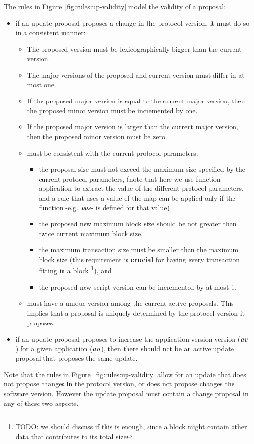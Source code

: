 The rules in Figure~\ref{fig:rules:up-validity} model the validity of a proposal:
\begin{itemize}
\item if an update proposal proposes a change in the protocol version, it must
  do so in a consistent manner:
  \begin{itemize}
  \item The proposed version must be lexicographically bigger than the
    current version.
  \item The major versions of the proposed and current version must differ in
    at most one.
  \item If the proposed major version is equal to the current major
    version, then the proposed minor version must be incremented by one.
  \item If the proposed major version is larger than the current major version,
    then the proposed minor version must be zero.
  \item must be consistent with the current protocol parameters:
    \begin{itemize}
    \item the proposal size must not exceed the maximum size specified by the
      current protocol parameters, (note that here we use function application
      to extract the value of the different protocol parameters, and a rule
      that uses a value of the map can be applied only if the function -e.g.
      $\mathit{pps}$- is defined for that value)
    \item the proposed new maximum block size should be not greater than twice
      current maximum block size,
    \item the maximum transaction size must be smaller than the maximum block
      size (this requirement is \textbf{crucial} for having every transaction
      fitting in a block \footnote{TODO: we should discuss if this is enough,
        since a block might contain other data that contributes to its total
        size}), and
    \item the proposed new script version can be incremented by at most 1.
    \end{itemize}
  \item must have a unique version among the current active proposals. This
    implies that a proposal is uniquely determined by the protocol version it
    proposes.
  \end{itemize}
\item if an update proposal proposes to increase the application version
  version ($\mathit{av}$) for a given application ($\mathit{an}$), then there should
  not be an active update proposal that proposes the same update.
\end{itemize}
Note that the rules in Figure~\ref{fig:rules:up-validity} allow for an update
that does not propose changes in the protocol version, or does not propose
changes the software version. However the update proposal must contain a change
proposal in any of these two aspects.
%

